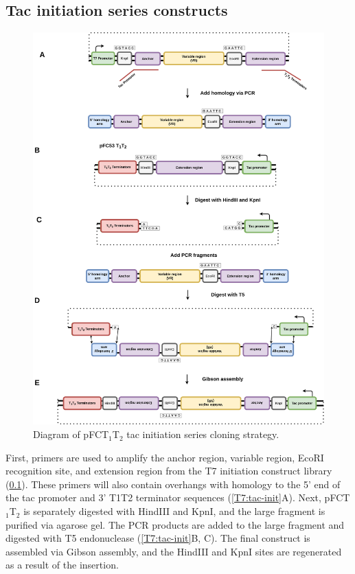 \documentclass[11pt]{article}
\begin{document}
\subsection{Tac initiation series constructs}
\label{sec:tac-init}

\begin{figure}[H]
	\includegraphics[width=15cm]{images/cloning_diagrams/construct_diagrams-Tac-initiation-series.png}
	\centering
	\caption{Diagram of pFCT$_1$T$_2$ tac initiation series cloning strategy.}
\end{figure}

First,  primers are used to amplify the anchor region, variable region, EcoRI recognition site, and extension region from the T7 initiation construct library (\ref{sec:tac-init}). These primers will also contain overhangs with homology to the 5' end of the tac promoter and 3' T1T2 terminator sequences (\ref{T7:tac-init}A). Next, pFCT$_1$T$_2$ is separately digested with HindIII and KpnI, and the large fragment is purified via agarose gel. The PCR products are added to the large fragment and digested with T5 endonuclease (\ref{T7:tac-init}B, C). The final construct is assembled via Gibson assembly, and the HindIII and KpnI sites are regenerated as a result of the insertion. 
\end{document}
